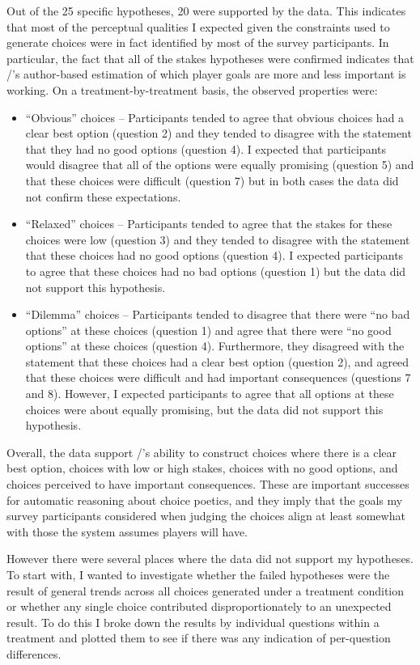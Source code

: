 Out of the 25 specific hypotheses, 20 were supported by the data.
%
This indicates that most of the perceptual qualities I expected given the constraints used to generate choices were in fact identified by most of the survey participants.
%
In particular, the fact that all of the stakes hypotheses were confirmed indicates that \dunyazad/'s author-based estimation of which player goals are more and less important is working.
%
On a treatment-by-treatment basis, the observed properties were:
%
\begin{itemize}
  \item ``Obvious'' choices -- Participants tended to agree that obvious choices had a clear best option (question 2) and they tended to disagree with the statement that they had no good options (question 4). I expected that participants would disagree that all of the options were equally promising (question 5) and that these choices were difficult (question 7) but in both cases the data did not confirm these expectations.
  \item ``Relaxed'' choices -- Participants tended to agree that the stakes for these choices were low (question 3) and they tended to disagree with the statement that these choices had no good options (question 4). I expected participants to agree that these choices had no bad options (question 1) but the data did not support this hypothesis.
  \item ``Dilemma'' choices -- Participants tended to disagree that there were ``no bad options'' at these choices (question 1) and agree that there were ``no good options'' at these choices (question 4). Furthermore, they disagreed with the statement that these choices had a clear best option (question 2), and agreed that these choices were difficult and had important consequences (questions 7 and 8). However, I expected participants to agree that all options at these choices were about equally promising, but the data did not support this hypothesis.
\end{itemize}
%
Overall, the data support \dunyazad/'s ability to construct choices where there is a clear best option, choices with low or high stakes, choices with no good options, and choices perceived to have important consequences.
These are important successes for automatic reasoning about choice poetics, and they imply that the goals my survey participants considered when judging the choices align at least somewhat with those the system assumes players will have.


However there were several places where the data did not support my hypotheses.
%
To start with, I wanted to investigate whether the failed hypotheses were the result of general trends across all choices generated under a treatment condition or whether any single choice contributed disproportionately to an unexpected result.
%
To do this I broke down the results by individual questions within a treatment and plotted them to see if there was any indication of per-question differences.


